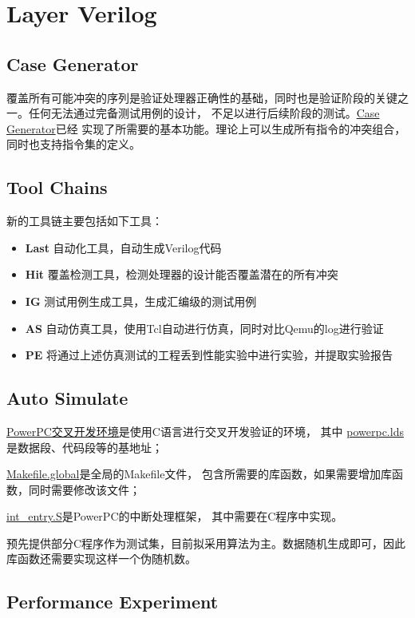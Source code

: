 \documentclass[hyperref,UTF8]{ctexart}
\theoremstyle{definition}
\theoremstyle{remark}
\numberwithin{equation}{subsection}
\newcommand{\Emph}{\textbf}
\begin{document}
	
	
\section{Layer Verilog}
\label{sec:layer_verilog}	

\subsection{Case Generator}

	覆盖所有可能冲突的序列是验证处理器正确性的基础，同时也是验证阶段的关键之一。任何无法通过完备测试用例的设计，
	不足以进行后续阶段的测试。\href{https://github.com/Turf1013/PPC_AutoTool/tree/master/IG}{Case Generator}已经
	实现了所需要的基本功能。理论上可以生成所有指令的冲突组合，同时也支持指令集的定义。

\subsection{Tool Chains}
	
	新的工具链主要包括如下工具：
	\begin{itemize}
		\item \Emph{Last} 自动化工具，自动生成Verilog代码
		\item \Emph{Hit} 覆盖检测工具，检测处理器的设计能否覆盖潜在的所有冲突
		\item \Emph{IG} 测试用例生成工具，生成汇编级的测试用例
		\item \Emph{AS} 自动仿真工具，使用Tcl自动进行仿真，同时对比Qemu的log进行验证
		\item \Emph{PE} 将通过上述仿真测试的工程丢到性能实验中进行实验，并提取实验报告
	\end{itemize}
	
\subsection{Auto Simulate}

	\href{https://github.com/Turf1013/PPC_AutoTool/tree/master/PPC}{PowerPC交叉开发环境}是使用C语言进行交叉开发验证的环境，
	其中
	\href{https://github.com/Turf1013/PPC_AutoTool/blob/master/PPC/global/powerpc.lds}{powerpc.lds}是数据段、代码段等的基地址；
	
	\href{https://github.com/Turf1013/PPC_AutoTool/blob/master/PPC/global/Makefile.global}{Makefile.global}是全局的Makefile文件，
	包含所需要的库函数，如果需要增加库函数，同时需要修改该文件；
	
	\href{https://github.com/Turf1013/PPC_AutoTool/blob/master/PPC/global/int_entry.S}{int\_entry.S}是PowerPC的中断处理框架，
	其中需要在C程序中实现。
	
	预先提供部分C程序作为测试集，目前拟采用算法为主。数据随机生成即可，因此库函数还需要实现这样一个伪随机数。

\subsection{Performance Experiment}
	
\end{document}
